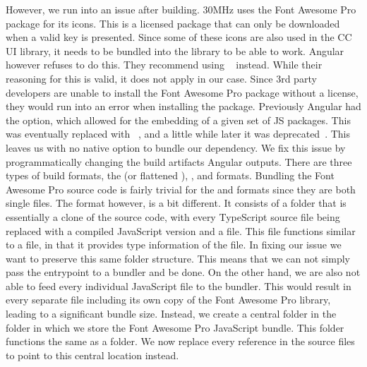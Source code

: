 {	However, we run into an issue after building. 30MHz uses the Font Awesome Pro~ package for its icons. This is a licensed package that can only be downloaded when a valid key is presented. Since some of these icons are also used in the CC UI library, it needs to be bundled into the library to be able to work. Angular however refuses to do this. They recommend using ~ instead. While their reasoning for this is valid, it does not apply in our case. Since 3rd party developers are unable to install the Font Awesome Pro package without a license, they would run into an error when installing the package. Previously Angular had the  option, which allowed for the embedding of a given set of JS packages. This was eventually replaced with ~, and a little while later it was deprecated~. This leaves us with no native option to bundle our dependency.
}{
	We fix this issue by programmatically changing the build artifacts Angular outputs. There are three types of build formats, the  (or flattened ), , and  formats. Bundling the Font Awesome Pro source code is fairly trivial for the  and  formats since they are both single files. The  format however, is a bit different. It consists of a folder that is essentially a clone of the source code, with every TypeScript source file being replaced with a compiled JavaScript version and a  file. This  file functions similar to a  file, in that it provides type information of the file. In fixing our issue we want to preserve this same folder structure. This means that we can not simply pass the entrypoint to a bundler and be done. On the other hand, we are also not able to feed every individual JavaScript file to the bundler. This would result in every separate file including its own copy of the Font Awesome Pro library, leading to a significant bundle size. Instead, we create a central folder in the  folder in which we store the Font Awesome Pro JavaScript bundle. This folder functions the same as a  folder. We now replace every reference in the source files to point to this central location instead.
}

